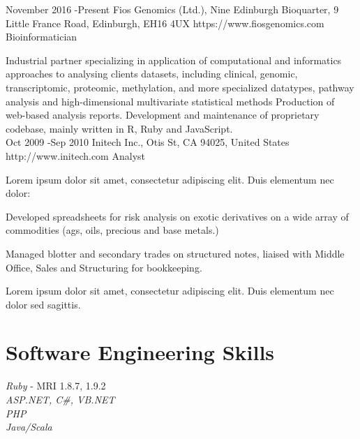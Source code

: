 \documentclass[10pt]{article} %
\begin{document}
\job
{November 2016 -}{Present}
{Fios Genomics (Ltd.), Nine Edinburgh Bioquarter, 9 Little France Road,  Edinburgh, EH16 4UX}
{https://www.fiosgenomics.com}
{Bioinformatician}
{Industrial partner specializing in application of computational and informatics approaches to analysing clients datasets, including clinical, genomic, transcriptomic, proteomic, methylation, and more specialized datatypes, pathway analysis and high-dimensional multivariate statistical methods
Production of web-based analysis reports.
Development and maintenance of proprietary codebase, mainly written in R, Ruby and JavaScript. \\


\job
{Oct 2009 -}{Sep 2010}
{Initech Inc., Otis St, CA 94025, United States}
{http://www.initech.com}
{Analyst}
{Lorem ipsum dolor sit amet, consectetur adipiscing elit. Duis elementum nec dolor:

\begin{itemize-noindent}
\item{Developed spreadsheets for risk analysis on exotic derivatives on a wide array of commodities (ags, oils, precious and base metals.)}
\item{Managed blotter and secondary trades on structured notes, liaised with Middle Office, Sales and Structuring for bookkeeping.}
\end{itemize-noindent}

Lorem ipsum dolor sit amet, consectetur adipiscing elit. Duis elementum nec dolor sed sagittis.}


\section{Software Engineering Skills}

{
\textit{Ruby} - MRI 1.8.7, 1.9.2\\
\textit{ASP.NET, C\#, VB.NET}\\
\textit{PHP}\\
\textit{Java/Scala}
}


}
\end{document}
